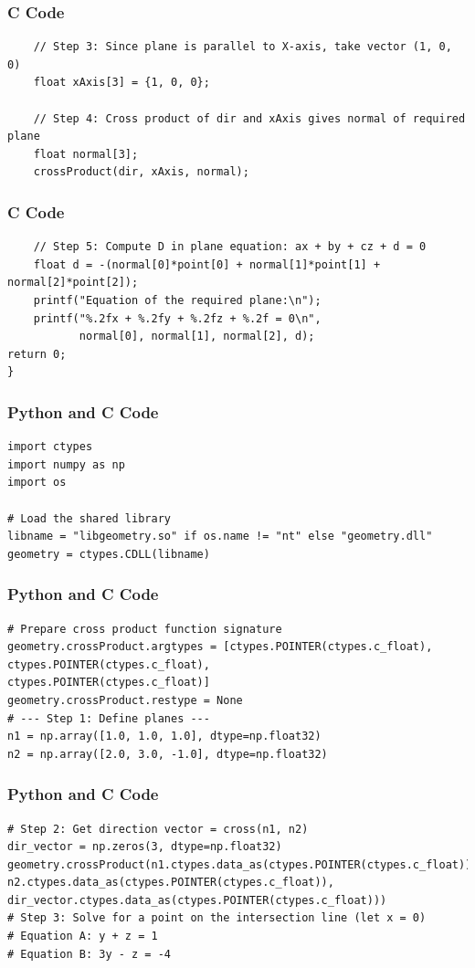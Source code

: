 \documentclass{beamer}
\begin{document}
\begin{frame}[fragile]
\frametitle{C Code}
\begin{lstlisting}
    // Step 3: Since plane is parallel to X-axis, take vector (1, 0, 0)
    float xAxis[3] = {1, 0, 0};

    // Step 4: Cross product of dir and xAxis gives normal of required plane
    float normal[3];
    crossProduct(dir, xAxis, normal);
\end{lstlisting}
\end{frame}

\begin{frame}[fragile]
\frametitle{C Code}
\begin{lstlisting}
    // Step 5: Compute D in plane equation: ax + by + cz + d = 0
    float d = -(normal[0]*point[0] + normal[1]*point[1] + normal[2]*point[2]);
    printf("Equation of the required plane:\n");
    printf("%.2fx + %.2fy + %.2fz + %.2f = 0\n",
           normal[0], normal[1], normal[2], d);
return 0;
}
\end{lstlisting}
\end{frame}

\begin{frame}[fragile]
\frametitle{Python and C Code}
\begin{lstlisting}
import ctypes
import numpy as np
import os

# Load the shared library
libname = "libgeometry.so" if os.name != "nt" else "geometry.dll"
geometry = ctypes.CDLL(libname)
\end{lstlisting}
\end{frame}

\begin{frame}[fragile]
\frametitle{Python and C Code}
\begin{lstlisting}
# Prepare cross product function signature
geometry.crossProduct.argtypes = [ctypes.POINTER(ctypes.c_float),
ctypes.POINTER(ctypes.c_float),
ctypes.POINTER(ctypes.c_float)]
geometry.crossProduct.restype = None
# --- Step 1: Define planes ---
n1 = np.array([1.0, 1.0, 1.0], dtype=np.float32)
n2 = np.array([2.0, 3.0, -1.0], dtype=np.float32)
\end{lstlisting}
\end{frame}

\begin{frame}[fragile]
\frametitle{Python and C Code}
\begin{lstlisting}
# Step 2: Get direction vector = cross(n1, n2)
dir_vector = np.zeros(3, dtype=np.float32)
geometry.crossProduct(n1.ctypes.data_as(ctypes.POINTER(ctypes.c_float)),
n2.ctypes.data_as(ctypes.POINTER(ctypes.c_float)),
dir_vector.ctypes.data_as(ctypes.POINTER(ctypes.c_float)))
# Step 3: Solve for a point on the intersection line (let x = 0)
# Equation A: y + z = 1
# Equation B: 3y - z = -4
\end{lstlisting}
\end{frame}
\end{document}
